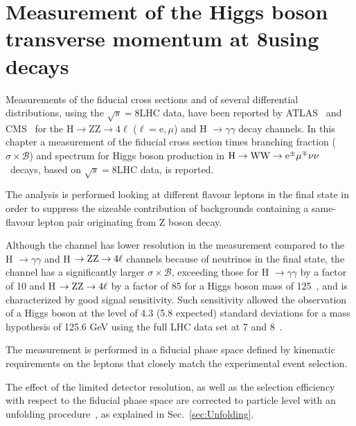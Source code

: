 \chapter{Measurement of the Higgs boson transverse momentum at 8\TeV using \hwwllnn decays}\label{chap4}
\thispagestyle{empty}

Measurements of the fiducial cross sections and of several differential
distributions, using the $\sqrt{s}=8$\TeV LHC data, have been reported by ATLAS~\cite{Aad:2014tca,Aad:2014lwa,Aad:2015lha} and CMS~\cite{Khachatryan:2015rxa,Khachatryan:2015yvw} for the ${\mathrm{H} \to \mathrm{ZZ} \to 4\ell}$ ($\ell = \mathrm{e},\mu$) and H $\to \gamma\gamma$ decay channels. In this chapter a measurement of the fiducial cross section times branching fraction ($\sigma \times \mathcal{B}$) and \pt{} spectrum for Higgs boson production in \ensuremath{\mathrm{H}\rightarrow{}\WW\rightarrow \mathrm{e}^{\pm} \mu^{\mp}\nu\nu} ~decays, based on $\sqrt{s} = 8$\TeV LHC data, is reported.

The analysis is performed looking at different flavour leptons in the final state in order to suppress the sizeable contribution of backgrounds containing a same-flavour lepton pair originating from Z boson decay.

Although the \hwwllnn{} channel has lower resolution in the \pth{} measurement
compared to the H $\to \gamma\gamma$ and  H $\to \rm{ZZ}\to 4\ell$ channels
because of neutrinos in the final state, the channel has a significantly
larger $\sigma \times \mathcal{B}$, exceeding those for H $\to \gamma\gamma$ by a factor
of 10 and H $\to \rm{ZZ}\to 4\ell$ by a factor of 85 for a Higgs boson mass of
125\GeV~\cite{Heinemeyer:2013tqa}, and is characterized by good signal
sensitivity. Such sensitivity allowed the observation of a Higgs boson at the level of 4.3 (5.8 expected)
standard deviations for a mass hypothesis of 125.6 GeV using the full LHC data set at 7 and 8\TeV~\cite{Chatrchyan:2013iaa}.

The measurement is performed in a fiducial phase space defined by kinematic requirements on
the leptons that closely match the experimental event selection.

The effect of the limited detector resolution, as well as the
selection efficiency with respect to the fiducial phase space are corrected to
particle level with an unfolding procedure~\cite{Cowan:2002in}, as explained in Sec.~\ref{sec:Unfolding}.

%


%
%




%

\clearpage

